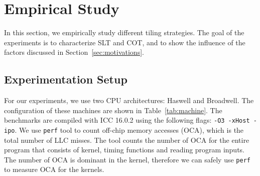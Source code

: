 \section{Empirical Study}
\label{sec:experiments}
In this section, we empirically study different tiling strategies. The goal of
the experiments is to characterize SLT and COT, and to show the influence of the
factors discussed in Section~\ref{sec:motivations}. 



\subsection{Experimentation Setup}
For our experiments, we use two CPU architectures: Haswell and Broadwell. The
configuration of these machines are shown in Table~\ref{tab:machine}.  The
benchmarks are compiled with ICC 16.0.2 using the following flags: \texttt{-O3
-xHost -ipo}.  We use \texttt{perf} tool to count off-chip memory accesses
(OCA), which is the total number of LLC misses. The tool counts the number of
OCA for the entire program that consists of kernel, timing functions and reading
program inputs. The number of OCA is dominant in the kernel, therefore we can
safely use \texttt{perf} to measure OCA for the kernels.

